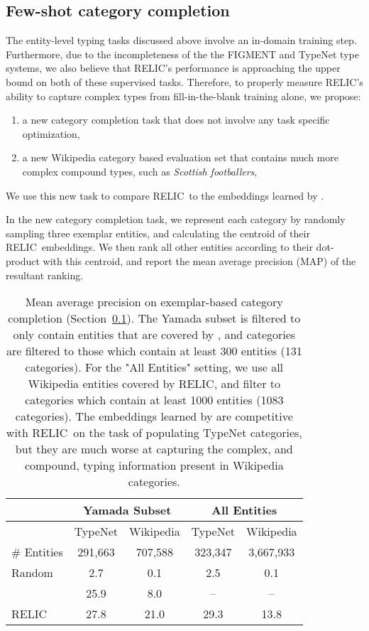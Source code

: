 \documentclass{article} \usepackage{iclr2020_conference,times}
\newcommand{\ack}{RELIC\xspace}
\begin{document}
\subsection{Few-shot category completion} \label{sec:category_completion}
The entity-level typing tasks discussed above involve an in-domain training step. 
Furthermore, due to the incompleteness of the the FIGMENT and TypeNet type systems, we also believe that \ack's performance is approaching the upper bound on both of these supervised tasks.
Therefore, to properly measure \ack's ability to capture complex types from fill-in-the-blank training alone, we propose:

\begin{enumerate}
\item a new category completion task that does not involve any task specific optimization,
\item a new Wikipedia category based evaluation set that contains much more complex compound types, such as {\it Scottish footballers},
\end{enumerate}

We use this new task to compare \ack~to the embeddings learned by \citealt{yamada-etal-2017-learning}.

In the new category completion task, we represent each category by randomly sampling three exemplar entities, and calculating the centroid of their \ack~embeddings.
We then rank all other entities according to their dot-product with this centroid, and report the mean average precision (MAP) of the resultant ranking.


\begin{table}[]
    \centering
    \begin{tabular}{|l||c|c||c|c|}
    \hline
    & \multicolumn{2}{c||}{Yamada Subset} & \multicolumn{2}{c|}{All Entities} \\ \hline
    & TypeNet & Wikipedia & TypeNet & Wikipedia \\ \hline
    \# Entities & 291,663 & 707,588 & 323,347 & 3,667,933 \\ \hline
    Random & 2.7 & 0.1 & 2.5 & 0.1 \\
    \citealt{yamada-etal-2017-learning} & 25.9 & 8.0 & -- & -- \\
    \ack & 27.8 & 21.0 & 29.3 & 13.8 \\ \hline
\end{tabular}
    \caption{Mean average precision on exemplar-based category completion (Section~\ref{sec:category_completion}).
    The Yamada subset is filtered to only contain entities that are covered by \citealt{yamada-etal-2017-learning}, and categories are filtered to those
    which contain at least 300 entities (131 categories).
    For the "All Entities" setting, we use all Wikipedia entities covered by \ack, and filter to categories which contain at least 1000 entities (1083 categories).
    The embeddings learned by \citealt{yamada-etal-2017-learning} are competitive with \ack~on the task of populating TypeNet categories, but they are much worse at capturing the complex, and compound, typing information present in Wikipedia categories.}
    \label{tab:category_completion}
\end{table}
\end{document}

